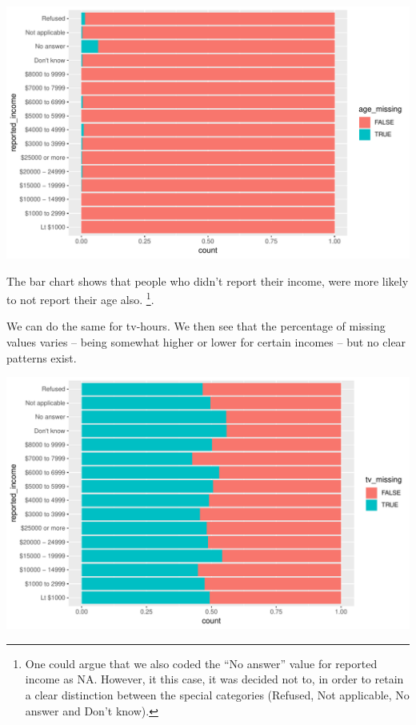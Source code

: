 \documentclass[]{tufte-book}
\newenvironment{Shaded}{}{}
\newcommand{\KeywordTok}[1]{\textcolor[rgb]{0.00,0.44,0.13}{\textbf{#1}}}
\newcommand{\DataTypeTok}[1]{\textcolor[rgb]{0.56,0.13,0.00}{#1}}
\newcommand{\StringTok}[1]{\textcolor[rgb]{0.25,0.44,0.63}{#1}}
\newcommand{\OperatorTok}[1]{\textcolor[rgb]{0.40,0.40,0.40}{#1}}
\newcommand{\NormalTok}[1]{#1}
\begin{document}
\includegraphics{cleaning_tutorial_files/figure-latex/unnamed-chunk-46-1}

The bar chart shows that people who didn't report their income, were
more likely to not report their age also. \footnote{One could argue that
  we also coded the ``No answer'' value for reported income as NA.
  However, it this case, it was decided not to, in order to retain a
  clear distinction between the special categories (Refused, Not
  applicable, No answer and Don't know).}.

We can do the same for tv-hours. We then see that the percentage of
missing values varies -- being somewhat higher or lower for certain
incomes -- but no clear patterns exist.

\begin{Shaded}
\end{Shaded}

\includegraphics{cleaning_tutorial_files/figure-latex/unnamed-chunk-47-1}
\end{document}
